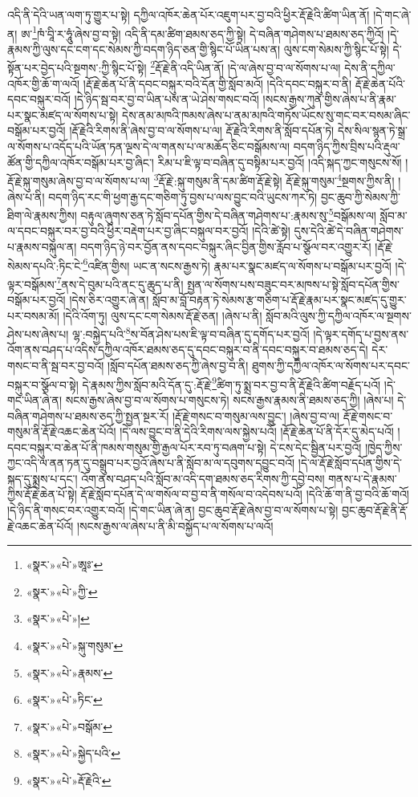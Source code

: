 འདི་ནི་དེའི་ཡན་ལག་ཏུ་གྱུར་པ་སྟེ། དཀྱིལ་འཁོར་ཆེན་པོར་འཇུག་པར་བྱ་བའི་ཕྱིར་རྡོ་རྗེའི་ཚིག་ཡིན་ནོ། །དེ་གང་ཞེ་ན། ཨ་\footnote{«སྣར་»«པེ་»ཨཱཿ་}ཁཾ་བཱི་ར་ཧཱུཾ་ཞེས་བྱ་བ་སྟེ། འདི་ནི་དམ་ཚིག་ཐམས་ཅད་ཀྱི་སྟེ། དེ་བཞིན་གཤེགས་པ་ཐམས་ཅད་ཀྱིའོ། །དེ་རྣམས་ཀྱི་ལུས་དང་ངག་དང་སེམས་ཀྱི་བདག་ཉིད་ཅན་གྱི་སྙིང་པོ་ཡིན་པས་ན། ལུས་ངག་སེམས་ཀྱི་སྙིང་པོ་སྟེ། དེ་སྟོན་པར་བྱེད་པའི་སྔགས་:ཀྱི་སྙིང་པོ་སྟེ། \footnote{«སྣར་»«པེ་»ཀྱི་}རྡོ་རྗེ་ནི་འདི་ཡིན་ནོ། །དེ་ལ་ཞེས་བྱ་བ་ལ་སོགས་པ་ལ། དེས་ནི་དཀྱིལ་འཁོར་གྱི་ཆོ་ག་ལའོ། །རྡོ་རྗེ་ཆེན་པོ་ནི་དབང་བསྐུར་བའི་དོན་གྱི་སློབ་མའོ། །དེའི་དབང་བསྐུར་བ་ནི། རྡོ་རྗེ་ཆེན་པོའི་དབང་བསྐུར་བའོ། །དེ་ཉིད་སྦ་བར་བྱ་བ་ཡིན་པས་ན་ཡེ་ཤེས་གསང་བའོ། །སངས་རྒྱས་ཀུན་གྱིས་ཞེས་པ་ནི་རྣམ་པར་སྣང་མཛད་ལ་སོགས་པ་སྟེ། དེས་ནམ་མཁའི་ཁམས་ཞེས་པ་ནམ་མཁའི་གཏོས་ཡོངས་སུ་གང་བར་བསམ་ཞིང་བསྒོམ་པར་བྱའོ། །རྡོ་རྗེའི་རིགས་ནི་ཞེས་བྱ་བ་ལ་སོགས་པ་ལ། རྡོ་རྗེའི་རིགས་ནི་སློབ་དཔོན་ཏེ། དེས་སིལ་སྙན་ཏེ་སྒྲ་ལ་སོགས་པ་འདོད་པའི་ཡོན་ཏན་ལྔས་དེ་ལ་གནས་པ་ལ་མཆོད་ཅིང་བསྒོམས་ལ། བདག་ཉིད་ཀྱིས་བྲིས་པའི་རྡུལ་ཚོན་གྱི་དཀྱིལ་འཁོར་བསྒོམ་པར་བྱ་ཞིང་། རིམ་པ་ཇི་ལྟ་བ་བཞིན་དུ་བསྟིམ་པར་བྱའོ། །འདི་སྐད་ཀྱང་གསུངས་སོ། །རྡོ་རྗེ་སྐུ་གསུམ་ཞེས་བྱ་བ་ལ་སོགས་པ་ལ། \footnote{«སྣར་»«པེ་»།  }རྡོ་རྗེ་:སྐུ་གསུམ་ནི་དམ་ཚིག་རྡོ་རྗེ་སྟེ། རྡོ་རྗེ་སྐུ་གསུམ་\footnote{«སྣར་»«པེ་»སྐུ་གསུམ་}སྔགས་ཀྱིས་ནི། །ཞེས་པ་ནི། བདག་ཉིད་རང་གི་ཕྱག་རྒྱ་དང་གཅིག་ཏུ་བྱས་པ་ལས་བྱུང་བའི་ཡུངས་ཀར་ཏེ། བྱང་ཆུབ་ཀྱི་སེམས་ཀྱི་ཐིག་ལེ་རྣམས་ཀྱིས། བརྟུལ་ཞུགས་ཅན་ཏེ་སློབ་དཔོན་གྱིས་དེ་བཞིན་གཤེགས་པ་:རྣམས་སུ་\footnote{«སྣར་»«པེ་»རྣམས་}བསྒོམས་ལ། སློབ་མ་ལ་དབང་བསྐུར་བར་བྱ་བའི་ཕྱིར་བརྡེག་པར་བྱ་ཞིང་བསྐུལ་བར་བྱའོ། །དེའི་ཚེ་སྟེ། དུས་དེའི་ཚེ་དེ་བཞིན་གཤེགས་པ་རྣམས་བསྐུལ་ན། བདག་ཉིད་ཉེ་བར་བྱོན་ནས་དབང་བསྐུར་ཞིང་བྱིན་གྱིས་རློབ་པ་སྩོལ་བར་འགྱུར་རོ། །རྡོ་རྗེ་སེམས་དཔའི་:ཏིང་ངེ་\footnote{«སྣར་»«པེ་»ཏིང་}འཛིན་གྱིས། ཡང་ན་སངས་རྒྱས་ཏེ། རྣམ་པར་སྣང་མཛད་ལ་སོགས་པ་བསྒོམ་པར་བྱའོ། །དེ་ལྟར་བསྒོམས་\footnote{«སྣར་»«པེ་»བསྒོམ་}ནས་དེ་བུམ་པའི་ནང་དུ་ཆུད་པ་ནི། སྤྱན་ལ་སོགས་པས་བཟུང་བར་མཁས་པ་སྟེ་སློབ་དཔོན་གྱིས་བསྒོམ་པར་བྱའོ། །དེས་ཅིར་འགྱུར་ཞེ་ན། སློབ་མ་བློ་བརྟན་ཏེ་སེམས་རྩ་གཅིག་པ་རྡོ་རྗེ་རྣམ་པར་སྣང་མཛད་དུ་གྱུར་པར་བསམ་མོ། །དེའི་འོག་ཏུ། ལུས་དང་ངག་སེམས་རྡོ་རྗེ་ཅན། །ཞེས་པ་ནི། སློབ་མའི་ལུས་ཀྱི་དཀྱིལ་འཁོར་ལ་སྔགས་ཤེས་པས་ཞེས་པ། ལྷ་:བསྐྱེད་པའི་\footnote{«སྣར་»«པེ་»སྐྱེད་པའི་}ས་བོན་ཤེས་པས་ཇི་ལྟ་བ་བཞིན་དུ་དགོད་པར་བྱའོ། །དེ་ལྟར་དགོད་པ་བྱས་ནས་འོག་ནས་བཤད་པ་འདིས་དཀྱིལ་འཁོར་ཐམས་ཅད་དུ་དབང་བསྐུར་བ་ནི་དབང་བསྐུར་བ་ཐམས་ཅད་དེ། དེར་གསང་བ་ནི་སྦ་བར་བྱ་བའོ། །སློབ་དཔོན་ཐམས་ཅད་ཀྱི་ཞེས་བྱ་བ་ནི། ཐུགས་ཀྱི་དཀྱིལ་འཁོར་ལ་སོགས་པར་དབང་བསྐུར་བ་སྩོལ་བ་སྟེ། དེ་རྣམས་ཀྱིས་སློབ་མའི་དོན་དུ་:རྡོ་རྗེ་\footnote{«སྣར་»«པེ་»རྡོ་རྗེའི་}ཚིག་ཏུ་སྨྲ་བར་བྱ་བ་ནི་རྡོ་རྗེའི་ཚིག་བརྗོད་པའོ། །དེ་གང་ཡིན་ཞེ་ན། སངས་རྒྱས་ཞེས་བྱ་བ་ལ་སོགས་པ་གསུངས་ཏེ། སངས་རྒྱས་རྣམས་ནི་ཐམས་ཅད་ཀྱི། །ཞེས་པ། དེ་བཞིན་གཤེགས་པ་ཐམས་ཅད་ཀྱི་སྤྱན་སྔར་རོ། །རྡོ་རྗེ་གསང་བ་གསུམ་ལས་བྱུང་། །ཞེས་བྱ་བ་ལ། རྡོ་རྗེ་གསང་བ་གསུམ་ནི་རྡོ་རྗེ་འཆང་ཆེན་པོའོ། །དེ་ལས་བྱུང་བ་ནི་དེའི་རིགས་ལས་སྐྱེས་པའོ། །རྡོ་རྗེ་ཆེན་པོ་ནི་དོར་དུ་མེད་པའོ། །དབང་བསྐུར་བ་ཆེན་པོ་ནི་ཁམས་གསུམ་གྱི་རྒྱལ་པོར་རབ་ཏུ་བཞག་པ་སྟེ། དེ་ངས་དེང་སྦྱིན་པར་བྱའོ། །ཁྱེད་ཀྱིས་ཀྱང་འདི་ལ་ནན་ཏན་དུ་བསྒྲུབ་པར་བྱའོ་ཞེས་པ་ནི་སློབ་མ་ལ་དབུགས་དབྱུང་བའོ། །དེ་ལ་རྡོ་རྗེ་སློབ་དཔོན་གྱིས་དེ་སྐད་དུ་སྨྲས་པ་དང་། འོག་ནས་བཤད་པའི་སློབ་མ་འདི་དག་ཐམས་ཅད་རིགས་ཀྱི་དབྱེ་བས། གནས་པ་དེ་རྣམས་ཀྱིས་རྡོ་རྗེ་ཆེན་པོ་སྟེ། རྡོ་རྗེ་སློབ་དཔོན་དེ་ལ་གསོལ་བ་བྱ་བ་ནི་གསོལ་བ་འདེབས་པའོ། །དེའི་ཆོ་ག་ནི་བྱ་བའི་ཆོ་གའོ། །དེ་ཉིད་ནི་གསང་བར་འགྱུར་བའོ། །དེ་གང་ཡིན་ཞེ་ན། བྱང་ཆུབ་རྡོ་རྗེ་ཞེས་བྱ་བ་ལ་སོགས་པ་སྟེ། བྱང་ཆུབ་རྡོ་རྗེ་ནི་རྡོ་རྗེ་འཆང་ཆེན་པོའོ། །སངས་རྒྱས་ལ་ཞེས་པ་ནི་མི་བསྐྱོད་པ་ལ་སོགས་པ་ལའོ། 
